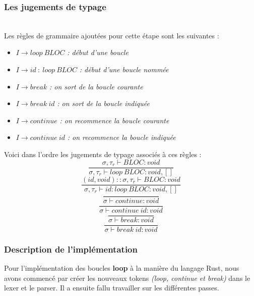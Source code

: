 \documentclass{article}
\begin{document}
\subsubsection{Les jugements de typage}
\ \\
Les règles de grammaire ajoutées pour cette étape sont les suivantes :

\begin{itemize}[label=\textbullet, font=\LARGE \color{black},leftmargin=1cm]
    \item $I \xrightarrow{} loop\ BLOC$ \textit{: début d'une boucle}
    \item $I \xrightarrow{} id\ :\ loop\ BLOC$ \textit{: début d'une boucle nommée}
    \item $I \xrightarrow{} break$ \textit{: on sort de la boucle courante}
    \item $I \xrightarrow{} break\ id$ \textit{: on sort de la boucle indiquée}
    \item $I \xrightarrow{} continue$ \textit{: on recommence la boucle courante}
    \item $I \xrightarrow{} continue\ id$ \textit{: on recommence la boucle indiquée}
\end{itemize}
\hbox{}
Voici dans l'ordre les jugements de typage associés à ces règles :
\begin{equation}
\frac {
    \sigma,\tau_r\vdash BLOC:void
}
{
    \sigma,\tau_r\vdash loop\ BLOC:void,[]
}
\end{equation}
\begin{equation}
\frac {
    (id, void)::\sigma,\tau_r\vdash BLOC:void
}
{
    \sigma,\tau_r\vdash id:loop\ BLOC:void,[]
}
\end{equation}
\begin{equation}
\frac {\ }
{
    \sigma\vdash continue:void
}
\end{equation}
\begin{equation}
\frac {\ }
{
    \sigma\vdash continue\ id:void
}
\end{equation}
\begin{equation}
\frac {\ }
{
    \sigma\vdash break:void
}
\end{equation}
\begin{equation}
\frac {\ }
{
    \sigma\vdash break\ id:void
}
\end{equation}

\subsubsection{Description de l'implémentation}
Pour l'implémentation des boucles \textbf{loop} à la manière du langage Rust, nous avons commencé par créer les nouveaux tokens \textit{(loop, continue et break)} dans le lexer et le parser. Il a ensuite fallu travailler sur les différentes passes.\\
\end{document}
